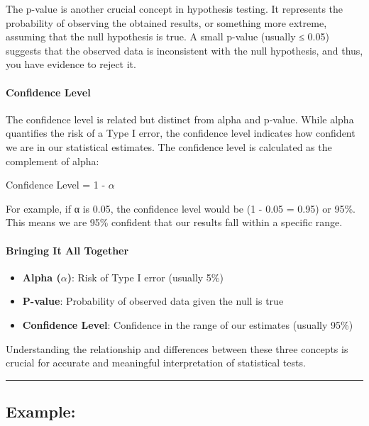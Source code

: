 \documentclass[
  letterpaper,
  DIV=11,
  numbers=noendperiod]{scrartcl}
\let\oldparagraph\paragraph
\renewcommand{\paragraph}[1]{\oldparagraph{#1}\mbox{}}
\providecommand{\tightlist}{%
  \setlength{\itemsep}{0pt}\setlength{\parskip}{0pt}}\usepackage{longtable,booktabs,array}
\begin{document}
The p-value is another crucial concept in hypothesis testing. It
represents the probability of observing the obtained results, or
something more extreme, assuming that the null hypothesis is true. A
small p-value (usually ≤ 0.05) suggests that the observed data is
inconsistent with the null hypothesis, and thus, you have evidence to
reject it.

\hypertarget{confidence-level}{%
\paragraph{Confidence Level}\label{confidence-level}}

The confidence level is related but distinct from alpha and p-value.
While alpha quantifies the risk of a Type I error, the confidence level
indicates how confident we are in our statistical estimates. The
confidence level is calculated as the complement of alpha:

Confidence Level = 1 - \(\alpha\)

For example, if α is 0.05, the confidence level would be (1 - 0.05 =
0.95) or 95\%. This means we are 95\% confident that our results fall
within a specific range.

\hypertarget{bringing-it-all-together}{%
\paragraph{Bringing It All Together}\label{bringing-it-all-together}}

\begin{itemize}
\tightlist
\item
  \textbf{Alpha (\(\alpha\))}: Risk of Type I error (usually 5\%)
\item
  \textbf{P-value}: Probability of observed data given the null is true
\item
  \textbf{Confidence Level}: Confidence in the range of our estimates
  (usually 95\%)
\end{itemize}

Understanding the relationship and differences between these three
concepts is crucial for accurate and meaningful interpretation of
statistical tests.

\begin{center}\rule{0.5\linewidth}{0.5pt}\end{center}

\hypertarget{example}{%
\subsection{Example:}\label{example}}
\end{document}
